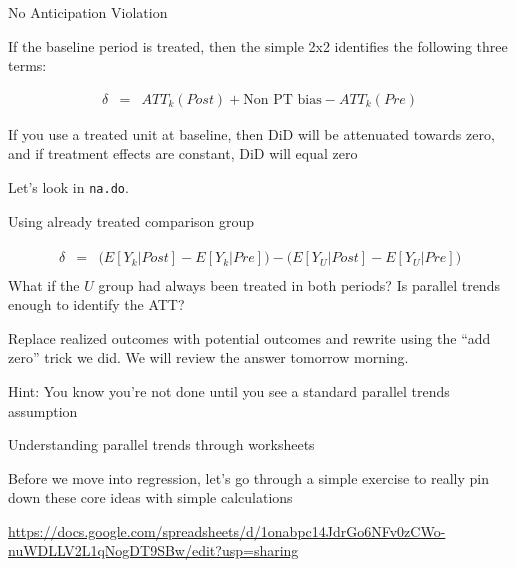 \documentclass{beamer}
\begin{document}
\begin{frame}{No Anticipation Violation}

If the baseline period is treated, then the simple 2x2 identifies the following three terms:

\begin{eqnarray*}
\delta &=& ATT_k(Post) + \text{Non PT bias}  - ATT_k(Pre)
\end{eqnarray*}

If you use a treated unit at baseline, then DiD will be attenuated towards zero, and if treatment effects are constant, DiD will equal zero

\bigskip 

Let's look in \texttt{na.do}.

\end{frame}




\begin{frame}{Using already treated comparison group}


\begin{eqnarray*}
\widehat{\delta} &=& \bigg ( E[Y_k|Post] - E[Y_k|Pre] \bigg ) - \bigg ( E[Y_U | Post ] - E[ Y_U | Pre] \bigg) \\
\end{eqnarray*}What if the $U$ group had always been treated in both periods? Is parallel trends enough to identify the ATT?

\bigskip

Replace realized outcomes with potential outcomes and rewrite using the ``add zero'' trick we did.  We will review the answer tomorrow morning.

\bigskip

Hint: You know you're not done until you see a standard parallel trends assumption


\end{frame}











\begin{frame}{Understanding parallel trends through worksheets}

Before we move into regression, let's go through a simple exercise to really pin down these core ideas with simple calculations

\bigskip 

\url{https://docs.google.com/spreadsheets/d/1onabpc14JdrGo6NFv0zCWo-nuWDLLV2L1qNogDT9SBw/edit?usp=sharing}

\end{frame}
\end{document}
